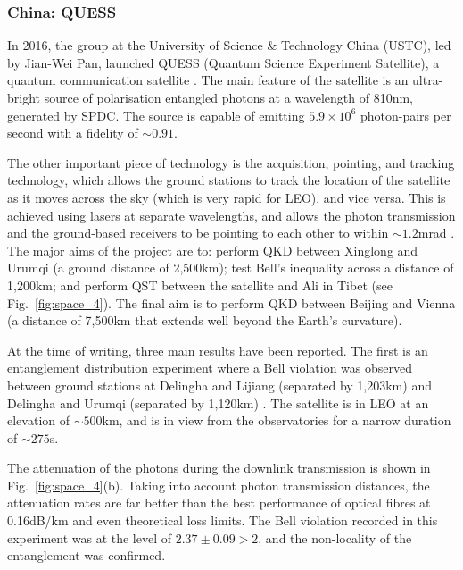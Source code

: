 %
%

\subsubsection{China: QUESS}

In 2016, the group at the University of Science \& Technology China (USTC), led by Jian-Wei Pan, launched QUESS (Quantum Science Experiment Satellite), a quantum communication satellite \cite{bib:N_535_478, bib:xin11}. The main feature of the satellite is an ultra-bright source of polarisation entangled photons at a wavelength of 810nm, generated by SPDC. The source is capable of emitting $5.9 \times 10^6$ photon-pairs per second with a fidelity of $\sim 0.91$.

The other important piece of technology is the acquisition, pointing, and tracking technology, which allows the ground stations to track the location of the satellite as it moves across the sky (which is very rapid for LEO), and vice versa. This is achieved using lasers at separate wavelengths, and allows the photon transmission and the ground-based receivers to be pointing to each other to within $\sim 1.2$mrad \cite{bib:yin2017satellite}. The major aims of the project are to: perform QKD between Xinglong and Urumqi (a ground distance of 2,500km); test Bell's inequality across a distance of 1,200km; and perform QST between the satellite and Ali in Tibet (see Fig.~\ref{fig:space_4}). The final aim is to perform QKD between Beijing and Vienna (a distance of 7,500km that extends well beyond the Earth's curvature). 

At the time of writing, three main results have been reported. The first is an entanglement distribution experiment where a Bell violation was observed between ground stations at Delingha and Lijiang (separated by 1,203km) and Delingha and Urumqi (separated by 1,120km) \cite{bib:yin2017satellite}. The satellite is in LEO at an elevation of $\sim500$km, and is in view from the observatories for a narrow duration of $\sim275$s.

The attenuation of the photons during the downlink transmission is shown in Fig.~\ref{fig:space_4}(b). Taking into account photon transmission distances, the attenuation rates are far better than the best performance of optical fibres at 0.16dB/km \cite{bib:yin2013lower} and even theoretical loss limits. The Bell violation recorded in this experiment was at the level of $2.37\pm 0.09>2$, and the non-locality of the entanglement was confirmed.

